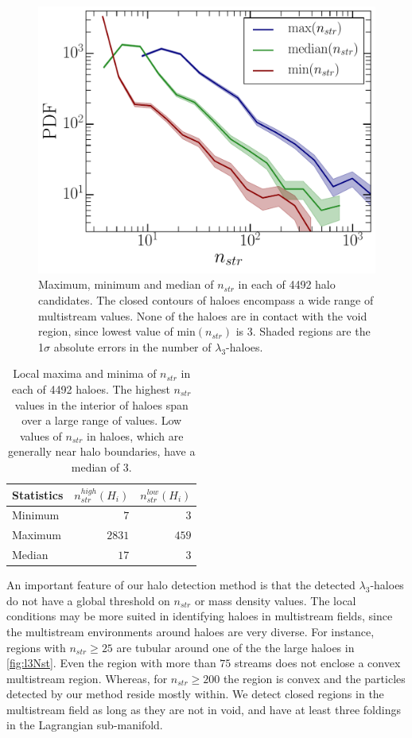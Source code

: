 \documentclass[fleqn,usenatbib,useAMS]{mnras}
\begin{document}
\begin{figure}
\begin{minipage}[t]{.99\linewidth}
 \centering\includegraphics[width=8.cm]{fig8.pdf} 
\end{minipage}\hfill
\caption{Maximum, minimum and median of $n_{str}$ in each of 4492 halo candidates. The closed contours of haloes encompass a wide range of multistream values. None of the haloes are in contact with the void region, since lowest value of min$(n_{str})$ is 3. Shaded regions are the 1$\sigma$ absolute errors in the number of $\lambda_3$-haloes. }
\label{fig:minmaxstr}
\end{figure}


\begin{table}
\caption{Local maxima and minima of $n_{str}$ in each of 4492 haloes. The highest $n_{str}$ values in the interior of haloes span over a large range of values. Low values of $n_{str}$ in haloes, which are generally near halo boundaries, have a median of 3.}
\begin{tabular}{|l|r|r|}
\hline
Statistics  &  $n_{str}^{high}(H_i)$ & $n_{str}^{low}(H_i)$ \\ \hline
Minimum     & $7$    & $3$  \\ \hline
Maximum     & $2831$ & $459$      \\ \hline
Median      & $17$   & $3$   \\ \hline
\end{tabular}
\label{tab:minmaxstr}
\end{table}


An important feature of our halo detection method is that the detected $\lambda_3$-haloes do not have a global threshold on $n_{str}$ or mass density values. The local conditions may be more suited in identifying haloes in multistream fields, since the multistream environments around haloes are very diverse. For instance, regions with $n_{str} \geq 25$ are tubular around one of the the large haloes in \autoref{fig:l3Nst}. Even the region with more than $75$ streams does not enclose a convex multistream region. Whereas, for $n_{str} \geq 200$ the region is convex and the particles detected by our method reside mostly within. We detect closed regions in the multistream field as long as they are not in void, and have at least three foldings in the Lagrangian sub-manifold.
\end{document}
